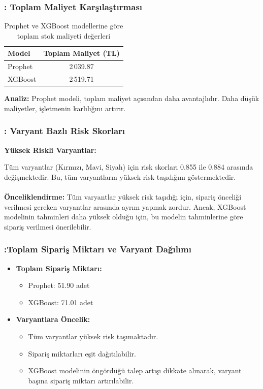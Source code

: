 \documentclass[12pt]{beamer}
\begin{document}
\begin{frame}
	\frametitle{\insertsection: Toplam Maliyet Karşılaştırması}
	\begin{table}
		\centering
		\small %
		\begin{tabular}{l c}
			\toprule
			\textbf{Model} & \textbf{Toplam Maliyet (TL)} \\
			\midrule
			Prophet        & 2\,039.87                    \\
			XGBoost        & 2\,519.71                    \\
			\bottomrule
		\end{tabular}
		\caption{\small Prophet ve XGBoost modellerine göre toplam stok
			maliyeti değerleri}
	\end{table}

	\textbf{Analiz: } Prophet modeli, toplam maliyet açısından daha avantajlıdır.
	Daha düşük maliyetler, işletmenin karlılığını artırır.
\end{frame}

\begin{frame}
	\frametitle{\insertsection: Varyant Bazlı Risk Skorları}
	\textbf{Yüksek Riskli Varyantlar:}

	Tüm varyantlar (Kırmızı, Mavi, Siyah) için risk skorları 0.855 ile
	0.884 arasında değişmektedir. Bu, tüm varyantların yüksek risk taşıdığını
	göstermektedir.
	\\~\\
	\textbf{Önceliklendirme:}
	Tüm varyantlar yüksek risk taşıdığı için, sipariş önceliği verilmesi
	gereken varyantlar arasında ayrım yapmak zordur. Ancak, XGBoost modelinin
	tahminleri daha yüksek olduğu için, bu modelin tahminlerine göre sipariş
	verilmesi önerilebilir.
\end{frame}

\begin{frame}
	\frametitle{\insertsection:Toplam Sipariş Miktarı ve Varyant Dağılımı}

	\begin{itemize}
		\item \textbf{Toplam Sipariş Miktarı:}
		      \begin{itemize}
			      \item Prophet: 51.90 adet
			      \item XGBoost: 71.01 adet
		      \end{itemize}

		\item \textbf{Varyantlara Öncelik:}
		      \begin{itemize}
			      \item Tüm varyantlar yüksek risk taşımaktadır.
			      \item Sipariş miktarları eşit dağıtılabilir.
			      \item XGBoost modelinin öngördüğü talep artışı dikkate
			            alınarak, varyant başına sipariş miktarı artırılabilir.
		      \end{itemize}
	\end{itemize}

\end{frame}
\end{document}
